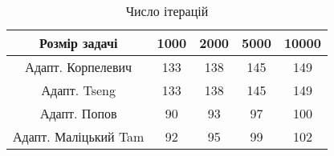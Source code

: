 \begin{table}[H]
	\centering
	\begin{tabular}{|c||c|c|c|c|}\hline
		Розмір задачі & 1000 & 2000 & 5000 & 10000 \\ \hline \hline
		Адапт. Корпелевич & 133 & 138 & 145 & 149 \\ \hline
		Адапт. Tseng & 133 & 138 & 145 & 149 \\ \hline
		Адапт. Попов & 90 & 93 & 97 & 100 \\ \hline
		Адапт. Маліцький Tam & 92 & 95 & 99 & 102 \\ \hline
	\end{tabular}
	\caption{Число ітерацій}
\end{table}
